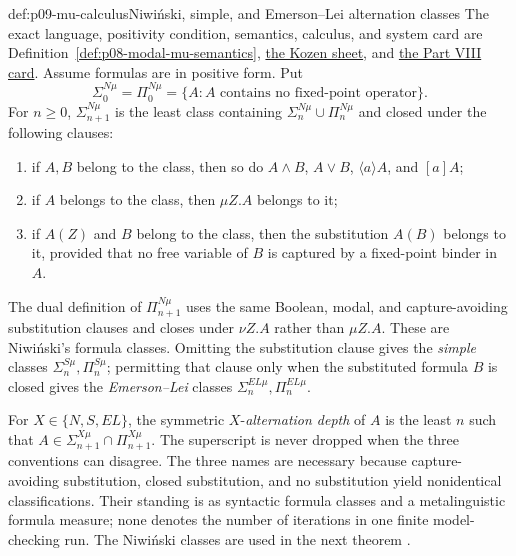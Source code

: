 \begin{hbdefinition}{def:p09-mu-calculus}{Niwi\'nski, simple, and Emerson--Lei alternation classes}
The exact language, positivity condition, semantics, calculus, and system card
are Definition~\ref{def:p08-modal-mu-semantics},
\hyperref[sheet:hilbert-mu]{the Kozen sheet}, and
\hyperref[entry:p08-modal-mu]{the Part VIII card}.  Assume formulas are in
positive form.  Put
\[
 \Sigma^{N\mu}_0=\Pi^{N\mu}_0
   =\{A:A\text{ contains no fixed-point operator}\}.
\]
For \(n\geq0\), \(\Sigma^{N\mu}_{n+1}\) is the least class containing
\(\Sigma^{N\mu}_n\cup\Pi^{N\mu}_n\) and closed under the following clauses:

\begin{enumerate}
\item if \(A,B\) belong to the class, then so do \(A\land B\), \(A\lor B\),
      \(\langle a\rangle A\), and \([a]A\);
\item if \(A\) belongs to the class, then \(\mu Z.A\) belongs to it;
\item if \(A(Z)\) and \(B\) belong to the class, then the substitution
      \(A(B)\) belongs to it, provided that no free variable of \(B\) is
      captured by a fixed-point binder in \(A\).
\end{enumerate}

The dual definition of \(\Pi^{N\mu}_{n+1}\) uses the same Boolean, modal, and
capture-avoiding substitution clauses and closes under \(\nu Z.A\) rather than
\(\mu Z.A\).  These are Niwi\'nski's formula classes.  Omitting the substitution
clause gives the \emph{simple} classes
\(\Sigma^{S\mu}_n,\Pi^{S\mu}_n\); permitting that clause only when the
substituted formula \(B\) is closed gives the \emph{Emerson--Lei} classes
\(\Sigma^{EL\mu}_n,\Pi^{EL\mu}_n\).

For \(X\in\{N,S,EL\}\), the symmetric \(X\)-\emph{alternation depth} of \(A\)
is the least \(n\) such that
\(A\in\Sigma^{X\mu}_{n+1}\cap\Pi^{X\mu}_{n+1}\).  The superscript is never
dropped when the three conventions can disagree.  The three names are
necessary because capture-avoiding substitution, closed substitution, and no
substitution yield nonidentical classifications.  Their standing is as
syntactic formula classes and a metalinguistic formula measure; none denotes
the number of iterations in one finite model-checking run.  The Niwi\'nski
classes are used in the next theorem \cite[sec.~7]{BradfieldStirling2007}.
\end{hbdefinition}

